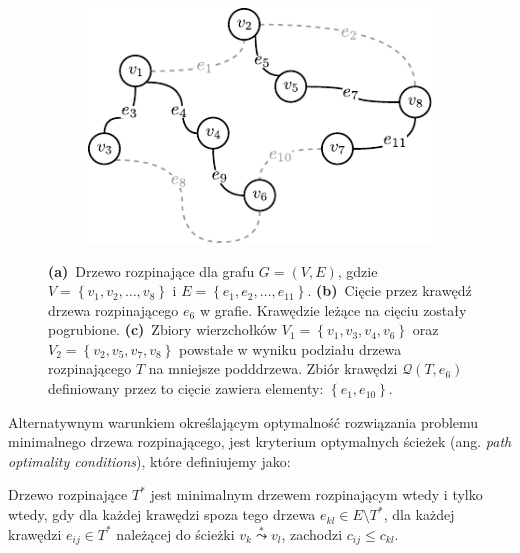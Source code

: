 \begin{figure}[!htbp]
\begin{subfigure}[b]{0.32\textwidth}
		\includegraphics[width=\textwidth]{Chapter_I/CUT-example/c}
		\caption{}
		\label{fig:cut:c}
	\end{subfigure}
	\hfill\null
	\caption{
		\textbf{(a)}~Drzewo rozpinające dla grafu $G = \left( V, E \right)$, gdzie $V = \left\{ v_{1}, v_{2}, \dots, v_{8} \right\}$ i $E = \left\{ e_{1}, e_{2}, \dots, e_{11} \right\}$.
		\textbf{(b)}~Cięcie przez krawędź drzewa rozpinającego $e_{6}$ w grafie. Krawędzie leżące na cięciu zostały pogrubione.
		\textbf{(c)}~Zbiory wierzchołków $V_{1} = \left\{ v_{1}, v_{3}, v_{4}, v_{6} \right\}$ oraz $V_{2} = \left\{ v_{2}, v_{5}, v_{7}, v_{8} \right\}$ powstałe w wyniku podziału drzewa rozpinającego $T$ na mniejsze podddrzewa. Zbiór krawędzi $\mathcal{Q} \left( T, e_{6} \right)$ definiowany przez to cięcie zawiera elementy: $\left\{ e_{1}, e_{10} \right\}$.
	}
	\label{fig:cut}
\end{figure}

Alternatywnym warunkiem określającym optymalność rozwiązania problemu minimalnego drzewa rozpinającego, jest kryterium optymalnych ścieżek (ang. \textit{path optimality conditions}), które definiujemy jako:

\begin{theorem}\label{def:optpath}
	Drzewo rozpinające $T^{\ast}$ jest minimalnym drzewem rozpinającym wtedy i tylko wtedy, gdy dla każdej krawędzi spoza tego drzewa $e_{kl} \in E \setminus T^{\ast}$, dla każdej krawędzi $e_{ij} \in T^{\ast}$ należącej do ścieżki $v_{k} \overset{\ast}{\leadsto} v_{l}$, zachodzi $c_{ij} \leqslant c_{kl}$.
\end{theorem}

